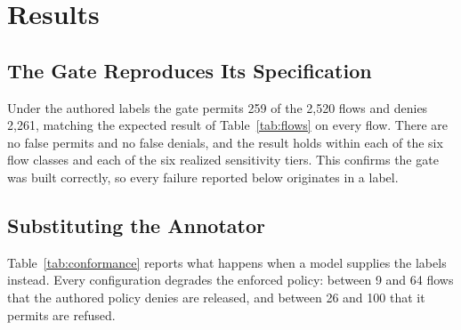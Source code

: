 \section{ Results}
\label{sec:results}

\subsection{The Gate Reproduces Its Specification}
\label{sec:conformance}
Under the authored labels the gate permits 259 of the 2,520 flows and denies
2,261, matching the expected result of Table~\ref{tab:flows} on every flow.
There are no false permits and no false denials, and the result holds within
each of the six flow classes and each of the six realized sensitivity tiers.
This confirms the gate was built correctly, so every failure reported below
originates in a label.

\subsection{Substituting the Annotator}
\label{sec:substitution-results}
Table~\ref{tab:conformance} reports what happens when a model supplies the
labels instead. Every configuration degrades the enforced policy: between 9 and
64 flows that the authored policy denies are released, and between 26 and 100
that it permits are refused.

\begin{table}[t]
\centering
\caption{Label conformance against the authored policy. Tier and ACL are the
share of the 105 documents labeled exactly as authored. PV and OB are induced
privacy violations and over-blocks out of 2,520 flows. O:U is the ratio of
over-granted to under-granted roles.}
\label{tab:conformance}
\footnotesize
\setlength{\tabcolsep}{4pt}
\end{table}

